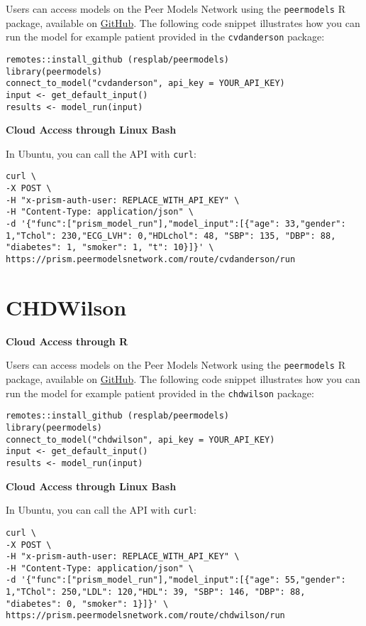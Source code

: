 \documentclass[
]{book}
\begin{document}
Users can access models on the Peer Models Network using the \texttt{peermodels} R package, available on \href{https://github.com/resplab/peermodels}{GitHub}. The following code snippet illustrates how you can run the model for example patient provided in the \texttt{cvdanderson} package:

\begin{verbatim}
remotes::install_github (resplab/peermodels)
library(peermodels)
connect_to_model("cvdanderson", api_key = YOUR_API_KEY)
input <- get_default_input()
results <- model_run(input)
\end{verbatim}

\textbf{Cloud Access through Linux Bash}

In Ubuntu, you can call the API with \texttt{curl}:

\begin{verbatim}
curl \
-X POST \
-H "x-prism-auth-user: REPLACE_WITH_API_KEY" \
-H "Content-Type: application/json" \
-d '{"func":["prism_model_run"],"model_input":[{"age": 33,"gender": 1,"Tchol": 230,"ECG_LVH": 0,"HDLchol": 48, "SBP": 135, "DBP": 88, "diabetes": 1, "smoker": 1, "t": 10}]}' \
https://prism.peermodelsnetwork.com/route/cvdanderson/run
\end{verbatim}

\hypertarget{chdwilson-1}{%
\section{CHDWilson}\label{chdwilson-1}}

\textbf{Cloud Access through R}

Users can access models on the Peer Models Network using the \texttt{peermodels} R package, available on \href{https://github.com/resplab/peermodels}{GitHub}. The following code snippet illustrates how you can run the model for example patient provided in the \texttt{chdwilson} package:

\begin{verbatim}
remotes::install_github (resplab/peermodels)
library(peermodels)
connect_to_model("chdwilson", api_key = YOUR_API_KEY)
input <- get_default_input()
results <- model_run(input)
\end{verbatim}

\textbf{Cloud Access through Linux Bash}

In Ubuntu, you can call the API with \texttt{curl}:

\begin{verbatim}
curl \
-X POST \
-H "x-prism-auth-user: REPLACE_WITH_API_KEY" \
-H "Content-Type: application/json" \
-d '{"func":["prism_model_run"],"model_input":[{"age": 55,"gender": 1,"TChol": 250,"LDL": 120,"HDL": 39, "SBP": 146, "DBP": 88, "diabetes": 0, "smoker": 1}]}' \
https://prism.peermodelsnetwork.com/route/chdwilson/run
\end{verbatim}
\end{document}

